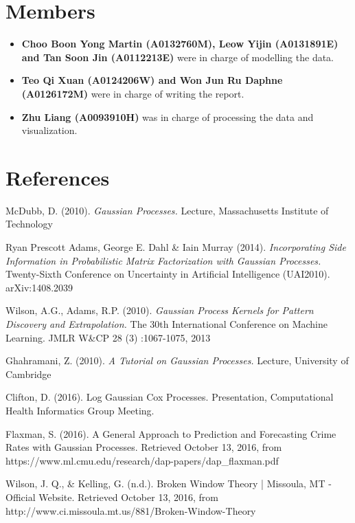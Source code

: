 \documentclass[letterpaper]{article}
\begin{document}
	\section{Members}
	\begin{itemize}
		\item {\bf Choo Boon Yong Martin (A0132760M), Leow Yijin (A0131891E) and Tan Soon Jin (A0112213E)} were in charge of modelling the data.
		\item {\bf Teo Qi Xuan (A0124206W) and Won Jun Ru Daphne (A0126172M)} were in charge of writing the report.
		\item {\bf Zhu Liang (A0093910H)} was in charge of processing the data and visualization.
	\end{itemize}

	\section{References}
	
	\smallskip \noindent McDubb, D. (2010).
	\textit{Gaussian Processes.}
	Lecture, Massachusetts Institute of Technology
	
	\smallskip \noindent Ryan Prescott Adams, George E. Dahl \& Iain Murray (2014).
	\textit{Incorporating Side Information in Probabilistic Matrix Factorization with Gaussian Processes.}
	Twenty-Sixth Conference on Uncertainty in Artificial Intelligence (UAI2010). arXiv:1408.2039

	\smallskip \noindent Wilson, A.G., Adams, R.P. (2010).
	\textit{Gaussian Process Kernels for Pattern Discovery and Extrapolation.}
	The 30th International Conference on Machine Learning. JMLR W\&CP 28 (3) :1067-1075, 2013
	
	\smallskip \noindent Ghahramani, Z. (2010).
	\textit{A Tutorial on Gaussian Processes.}
	Lecture, University of Cambridge
	
	\smallskip \noindent Clifton, D. (2016).
	Log Gaussian Cox Processes. Presentation, Computational Health Informatics Group Meeting.

	\smallskip \noindent Flaxman, S. (2016).
	A General Approach to Prediction and Forecasting Crime Rates with Gaussian Processes. Retrieved October 13, 2016, from https://www.ml.cmu.edu/research/dap-papers/dap\_flaxman.pdf

	\smallskip \noindent Wilson, J. Q., \& Kelling, G. (n.d.).
	Broken Window Theory | Missoula, MT - Official Website. Retrieved October 13, 2016, from http://www.ci.missoula.mt.us/881/Broken-Window-Theory
\end{document}
